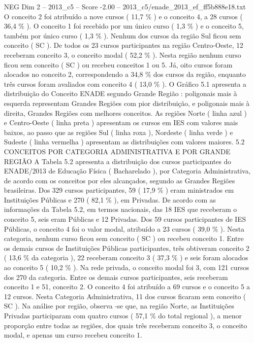 \begin{textsample}{NEG Dim 2 – 2013\_c5 – Score -2.00 – 2013\_c5/enade\_2013\_ef\_ff5b888e18.txt}
O conceito 2 foi atribuído a nove cursos ( 11,7 \% ) e o conceito 4, a 28 cursos ( 36,4 \% ).
O conceito 1 foi recebido por um único curso ( 1,3 \% ) e o conceito 5, também por único curso ( 1,3 \% ).
Nenhum dos cursos da região Sul ficou sem conceito ( SC ).
De todos os 23 cursos participantes na região Centro-Oeste, 12 receberam conceito 3, o conceito modal ( 52,2 \% ).
Nesta região nenhum curso ficou sem conceito ( SC ) ou recebeu conceitos 1 ou 5.
Já, oito cursos foram alocados no conceito 2, correspondendo a 34,8 \% dos cursos da região, enquanto três cursos foram avaliados com conceito 4 ( 13,0 \% ).
O Gráfico 5.1 apresenta a distribuição do Conceito ENADE segundo Grande Região : poligonais mais à esquerda representam Grandes Regiões com pior distribuição, e poligonais mais à direita, Grandes Regiões com melhores conceitos.
As regiões Norte ( linha azul ) e Centro-Oeste ( linha preta ) apresentam os cursos em IES com valores mais baixos, ao passo que as regiões Sul ( linha roxa ), Nordeste ( linha verde ) e Sudeste ( linha vermelha ) apresentam as distribuições com valores maiores. 5.2 CONCEITOS POR CATEGORIA ADMINISTRATIVA E POR GRANDE REGIÃO A Tabela 5.2 apresenta a distribuição dos cursos participantes do ENADE/2013 de Educação Física ( Bacharelado ), por Categoria Administrativa, de acordo com os conceitos por eles alcançados, segundo as Grandes Regiões brasileiras.
Dos 329 cursos participantes, 59 ( 17,9 \% ) eram ministrados em Instituições Públicas e 270 ( 82,1 \% ), em Privadas.
De acordo com as informações da Tabela 5.2, em termos nacionais, das 18 IES que receberam o conceito 5, seis eram Públicas e 12 Privadas.
Dos 59 cursos participantes de IES Públicas, o conceito 4 foi o valor modal, atribuído a 23 cursos ( 39,0 \% ).
Nesta categoria, nenhum curso ficou sem conceito ( SC ) ou recebeu conceito 1.
Entre os demais cursos de Instituições Públicas participantes, três obtiveram conceito 2 ( 13,6 \% da categoria ), 22 receberam conceito 3 ( 37,3 \% ) e seis foram alocados ao conceito 5 ( 10,2 \% ).
Na rede privada, o conceito modal foi 3, com 121 cursos dos 270 da categoria.
Entre os demais cursos participantes, seis receberam conceito 1 e 51, conceito 2.
O conceito 4 foi atribuído a 69 cursos e o conceito 5 a 12 cursos.
Nesta Categoria Administrativa, 11 dos cursos ficaram sem conceito ( SC ).
Na análise por região, observa -se que, na região Norte, as Instituições Privadas participaram com quatro cursos ( 57,1 \% do total regional ), a menor proporção entre todas as regiões, dos quais três receberam conceito 3, o conceito modal, e apenas um curso recebeu conceito 1.

\end{textsample}
